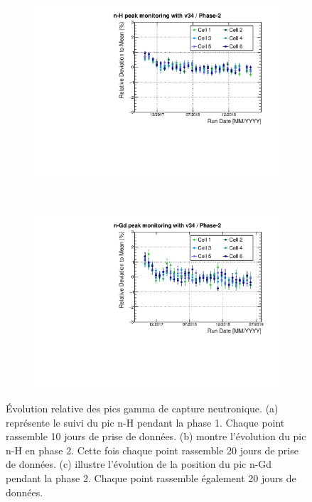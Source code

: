 {\begin{figure}[h!]
\begin{subfigure}[b]{0.49\textwidth}
\centering
\includegraphics[width=1\textwidth]{images/Mean_peak_Erec34_nH_250GC_phase-2_fit-crystalball_stacks-20_analysis.pdf}
\caption{}
\label{fig:Mean_peak_Erec34_nH_250GC_phase-2_fit-crystalball_stacks-20_analysis.pdf}
\end{subfigure}
~ %
\begin{subfigure}[b]{0.49\textwidth}
\centering
\includegraphics[width=1\textwidth]{images/Erec34_nGd_phase-2_fit-crystalball_stacks-20_analysis.pdf}
\caption{}
\label{fig:Erec34_nGd_phase-2_fit-crystalball_stacks-20_analysis.pdf}
\end{subfigure}


\caption[Évolution relative des pics gamma de capture neutronique]{Évolution relative des pics gamma de capture neutronique. (a) représente le suivi du pic n-H pendant la phase 1. Chaque point rassemble 10 jours de prise de données. (b) montre l'évolution du pic n-H en phase 2. Cette fois chaque point rassemble 20 jours de prise de données. (c) illustre l'évolution de la position du pic n-Gd pendant la phase 2. Chaque point rassemble également 20 jours de données.}
\label{fig:nX_relative_evol}

\end{figure}

\clearpage

}


